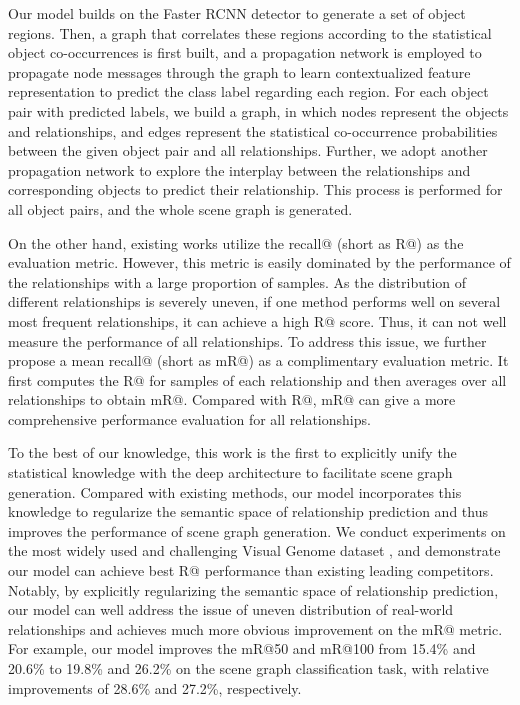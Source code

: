 \documentclass[10pt,twocolumn,letterpaper]{article}
\begin{document}
Our model builds on the Faster RCNN detector \cite{ren2015faster} to generate a set of object regions. Then, a graph that correlates these regions according to the statistical object co-occurrences is first built, and a propagation network is employed to propagate node messages through the graph to learn contextualized feature representation to predict the class label regarding each region. For each object pair with predicted labels, we build a graph, in which nodes represent the objects and relationships, and edges represent the statistical co-occurrence probabilities between the given object pair and all relationships. Further, we adopt another propagation network to explore the interplay between the relationships and corresponding objects to predict their relationship. This process is performed for all object pairs, and the whole scene graph is generated.

On the other hand, existing works utilize the recall@ (short as R@) \cite{lu2016visual} as the evaluation metric. However, this metric is easily dominated by the performance of the relationships with a large proportion of samples. As the distribution of different relationships is severely uneven, if one method performs well on several most frequent relationships, it can achieve a high R@ score. Thus, it can not well measure the performance of all relationships. To address this issue, we further propose a mean recall@ (short as mR@) as a complimentary evaluation metric. It first computes the R@ for samples of each relationship and then averages over all relationships to obtain mR@. Compared with R@, mR@ can give a more comprehensive performance evaluation for all relationships.

To the best of our knowledge, this work is the first to explicitly unify the statistical knowledge with the deep architecture to facilitate scene graph generation. Compared with existing methods, our model incorporates this knowledge to regularize the semantic space of relationship prediction and thus improves the performance of scene graph generation. We conduct experiments on the most widely used and challenging Visual Genome dataset \cite{krishna2017visual}, and demonstrate our model can achieve best R@ performance than existing leading competitors. Notably, by explicitly regularizing the semantic space of relationship prediction, our model can well address the issue of uneven distribution of real-world relationships and achieves much more obvious improvement on the mR@ metric. For example, our model improves the mR@50 and mR@100 from 15.4\% and 20.6\% to 19.8\% and 26.2\% on the scene graph classification task, with relative improvements of 28.6\% and 27.2\%, respectively. 
\end{document}
